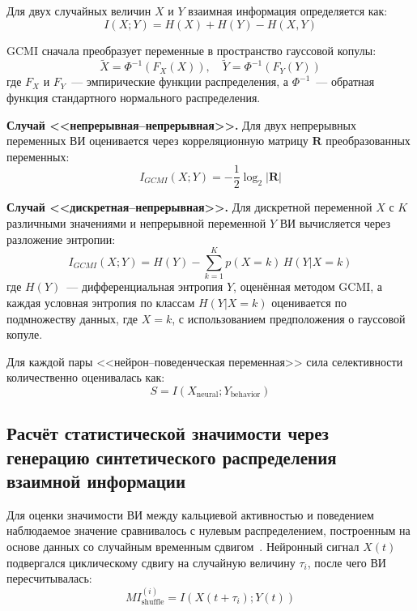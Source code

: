 Для двух случайных величин $X$ и $Y$ взаимная информация определяется как:
\begin{equation}
\label{eq:mi_def}
I(X;Y) = H(X) + H(Y) - H(X,Y)
\end{equation}

GCMI сначала преобразует переменные в пространство гауссовой копулы:
\begin{equation}
\label{eq:gcmi_transform}
\tilde{X} = \Phi^{-1}(F_X(X)), \quad \tilde{Y} = \Phi^{-1}(F_Y(Y))
\end{equation}
где $F_X$ и $F_Y$~--- эмпирические функции распределения, а $\Phi^{-1}$~--- обратная функция стандартного нормального распределения.

\textbf{Случай <<непрерывная--непрерывная>>.} Для двух непрерывных переменных ВИ оценивается через корреляционную матрицу $\mathbf{R}$ преобразованных переменных:
\begin{equation}
\label{eq:gcmi_continuous}
I_{GCMI}(X;Y) = -\frac{1}{2}\log_2|\mathbf{R}|
\end{equation}

\textbf{Случай <<дискретная--непрерывная>>.} Для дискретной переменной $X$ с $K$ различными значениями и непрерывной переменной $Y$ ВИ вычисляется через разложение энтропии:
\begin{equation}
\label{eq:gcmi_discrete}
I_{GCMI}(X;Y) = H(Y) - \sum_{k=1}^{K} p(X=k) \, H(Y | X=k)
\end{equation}
где $H(Y)$~--- дифференциальная энтропия $Y$, оценённая методом GCMI, а каждая условная энтропия по классам $H(Y|X=k)$ оценивается по подмножеству данных, где $X = k$, с использованием предположения о гауссовой копуле.

Для каждой пары <<нейрон--поведенческая переменная>> сила селективности количественно оценивалась как:
\begin{equation}
\label{eq:selectivity_strength}
S = I(X_{\text{neural}}; Y_{\text{behavior}})
\end{equation}


\subsection{Расчёт статистической значимости через генерацию синтетического распределения взаимной информации}\label{sec:intense_stat}

Для оценки значимости ВИ между кальциевой активностью и поведением наблюдаемое значение сравнивалось с нулевым распределением, построенным на основе данных со случайным временным сдвигом~\cite{skaggs1993information}. Нейронный сигнал $X(t)$ подвергался циклическому сдвигу на случайную величину $\tau_i$, после чего ВИ пересчитывалась:
$$MI_{\text{shuffle}}^{(i)} = I(X(t + \tau_i); Y(t))$$

